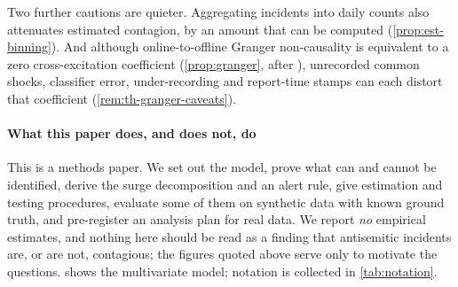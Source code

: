 Two further cautions are quieter. Aggregating incidents into daily counts
also attenuates estimated contagion, by an amount that can be computed
(\cref{prop:est-binning}). And although online-to-offline Granger
non-causality is equivalent to a zero cross-excitation coefficient
(\cref{prop:granger}, after \citealp{eichler2017}), unrecorded common shocks,
classifier error, under-recording and report-time stamps can each distort
that coefficient (\cref{rem:th-granger-caveats}).

\paragraph{What this paper does, and does not, do}
This is a methods paper. We set out the model, prove what can and cannot be
identified, derive the surge decomposition and an alert rule, give
estimation and testing procedures, evaluate some of them on synthetic data
with known ground truth, and pre-register an analysis plan for real data. We
report \emph{no} empirical estimates, and nothing here should be read as a
finding that antisemitic incidents are, or are not, contagious; the figures
quoted above serve only to motivate the questions.  shows
the multivariate model; notation is collected in \cref{tab:notation}.

%
